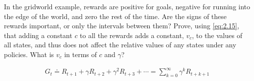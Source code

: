 
\begin{exercise}[Exercise 3.15]

In the gridworld example, rewards are positive for goals, negative for running into the edge of the world, and zero the rest of the time.
Are the signs of these rewards important, or only the intervals between them?
Prove, using \eqref{eq:2.15}, that adding a constant $c$ to all the rewards adds a constant, $v_c$, to the values of all states, and thus does not affect the relative values of any states under any policies.
What is $v_c$ in terms of $c$ and $\gamma$?

\begin{align} \label{eq:2.15}
    G_t
    \doteq
    R_{t+1} + \gamma R_{t+2} + \gamma^2 R_{t+3} + \cdots
    =
    \sum_{k=0}^\infty
        \gamma^k R_{t+k+1}
\end{align}

\end{exercise}


